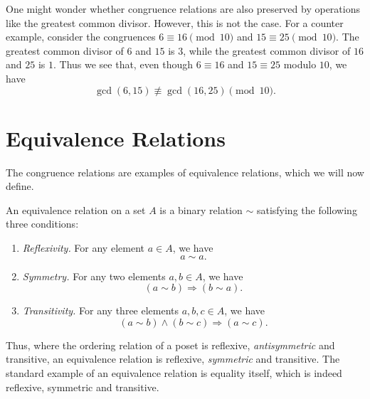 \begin{remark}
  One might wonder whether congruence relations are also preserved by operations like the greatest common divisor. However, this is not the case. For a counter example, consider the congruences $6\equiv 16\pmod{10}$ and $15\equiv 25\pmod{10}$. The greatest common divisor of $6$ and $15$ is $3$, while the greatest common divisor of $16$ and $25$ is $1$. Thus we see that, even though $6\equiv 16$ and $15\equiv 25$ modulo $10$, we have
  \begin{equation*}
    \gcd(6,15)\nequiv\gcd(16,25) \pmod{10}.
  \end{equation*}
\end{remark}

\section{Equivalence Relations}

The congruence relations are examples of equivalence relations, which we will now define.

\begin{definition}
  An equivalence relation on a set $A$ is a binary relation $\sim$ satisfying the following three conditions:
  \begin{enumerate}
  \item \emph{Reflexivity.} For any element $a\in A$, we have
    \begin{equation*}
      a\sim a.
    \end{equation*}
  \item \emph{Symmetry.} For any two elements $a,b\in A$, we have
    \begin{equation*}
      (a \sim b) \Rightarrow (b\sim a).
    \end{equation*}
  \item \emph{Transitivity.}
    For any three elements $a,b,c\in A$, we have
    \begin{equation*}
      (a \sim b)\land (b\sim c) \Rightarrow (a\sim c).
    \end{equation*}
  \end{enumerate}
\end{definition}

Thus, where the ordering relation of a poset is reflexive, \emph{antisymmetric} and transitive, an equivalence relation is reflexive, \emph{symmetric} and transitive. The standard example of an equivalence relation is equality itself, which is indeed reflexive, symmetric and transitive.

